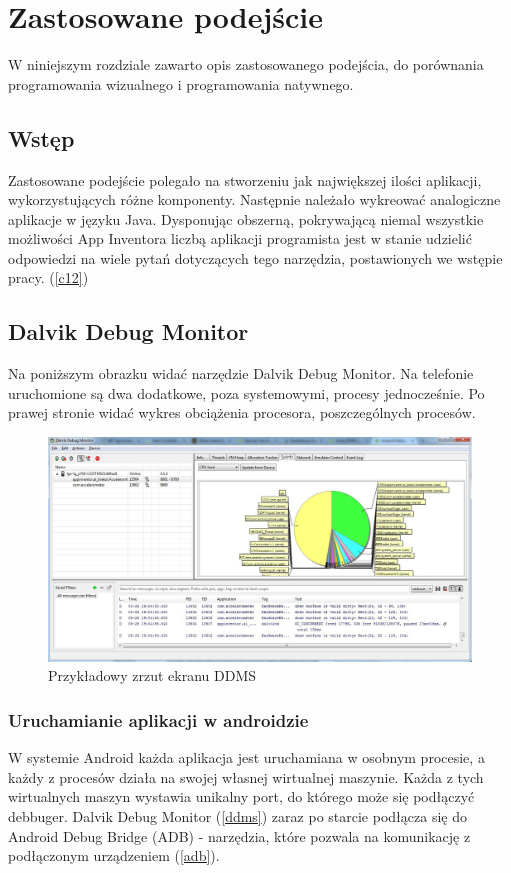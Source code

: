 \chapter{Zastosowane podejście}
\label{c4}

W niniejszym rozdziale zawarto opis zastosowanego podejścia, do porównania programowania wizualnego i programowania natywnego.

\section{Wstęp}
\label{c41}

Zastosowane podejście polegało na stworzeniu jak największej ilości aplikacji, wykorzystujących różne komponenty. Następnie należało wykreować analogiczne aplikacje w języku Java. Dysponując obszerną, pokrywającą niemal wszystkie możliwości App Inventora  liczbą aplikacji programista jest w stanie udzielić odpowiedzi na wiele pytań dotyczących tego narzędzia, postawionych we wstępie pracy. (\ref{c12})

\section{Dalvik Debug Monitor}

Na poniższym obrazku widać narzędzie Dalvik Debug Monitor. Na telefonie uruchomione są dwa dodatkowe, poza systemowymi, procesy jednocześnie. Po prawej stronie widać wykres obciążenia procesora, poszczególnych procesów.

\begin{figure}[H] 
\centering\includegraphics[width=12cm]{figures/dalvik}
\caption{Przykładowy zrzut ekranu DDMS}
\end{figure}



\subsection{Uruchamianie aplikacji w androidzie}
W systemie Android każda aplikacja jest uruchamiana w osobnym procesie, a każdy z procesów działa na swojej własnej wirtualnej maszynie. Każda z tych wirtualnych maszyn wystawia unikalny port, do którego może się podłączyć debbuger. Dalvik Debug Monitor (\ref{ddms}) zaraz po starcie podłącza się do Android Debug Bridge (ADB) - narzędzia, które pozwala na komunikację z podłączonym urządzeniem (\ref{adb}).

